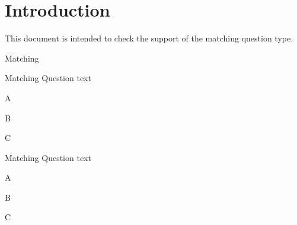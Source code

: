 \documentclass{article}
\begin{document}
\section*{Introduction}

This document is intended to check the support of the matching question type.

\begin{quiz}{Matching}

\begin{matching}[dd]{Matching}
Question text
\item A 
\item B 
\item C 
\item   {}
\end{matching}

\begin{matching}[shuffle=false]{Matching}
Question text
\item A 
\item B 
\item C 
\item   {}
\end{matching}

\end{quiz}
\end{document}
